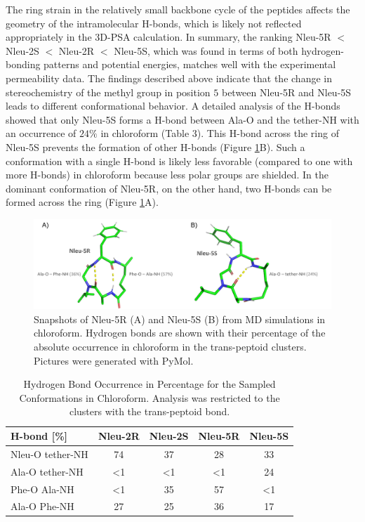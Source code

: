 The ring strain in the relatively small backbone cycle of the peptides affects the geometry of the intramolecular H-bonds, which is likely not reflected appropriately in the 3D-PSA calculation. 
In summary, the ranking Nleu-5R $<$ Nleu-2S $<$ Nleu-2R $<$ Nleu-5S, which was found in terms of both hydrogen-bonding patterns and potential energies, matches well with the experimental permeability data.
The findings described above indicate that the change in stereochemistry of the methyl group in position $5$ between Nleu-5R and Nleu-5S leads to different conformational behavior. 
A detailed analysis of the H-bonds showed that only Nleu-5S forms a H-bond between Ala-O and the tether-NH with an occurrence of $24\%$ in chloroform (Table 3). 
This H-bond across the ring of Nleu-5S prevents the formation of other H-bonds (Figure \ref{fig: HbondExamples}B).
Such a conformation with a single H-bond is likely less favorable (compared to one with more H-bonds) in chloroform because less polar groups are shielded. In the dominant conformation of Nleu-5R, on the other hand, two H-bonds can be formed across the ring (Figure \ref{fig: HbondExamples}A).
\begin{figure}
    \centering
    \includegraphics[width=\textwidth]{fig/results/ExampleHbonds.png}
    \caption{Snapshots of Nleu-5R (A) and Nleu-5S (B) from MD simulations in chloroform. Hydrogen bonds are shown with their percentage of the absolute occurrence in chloroform in the trans-peptoid clusters. Pictures were generated with PyMol. \cite{Delano2020}}
    \label{fig: HbondExamples}
\end{figure}

\begin{table}[]
    \centering
    \begin{tabular}{l|c|c|c|c}
    H-bond  [\%] &	Nleu-2R &	Nleu-2S &	Nleu-5R &	Nleu-5S  \\
    \hline
    Nleu-O tether-NH &	74 &	37 &	28 &	33 \\
    Ala-O tether-NH &	<1 &	<1 &	<1 &	24 \\
    Phe-O Ala-NH    &	<1 &	35 &	57 &	<1 \\
    Ala-O Phe-NH    &	27 &	25 &	36 &	17 \\
    \end{tabular}
    \caption{Hydrogen Bond Occurrence in Percentage for the Sampled Conformations in Chloroform. Analysis was restricted to the clusters with the trans-peptoid bond.}
    \label{tab: hbondsrationCLCH3}
\end{table}

